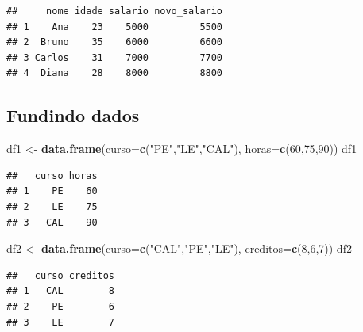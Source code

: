 \documentclass[
]{book}
\newenvironment{Shaded}{\begin{snugshade}}{\end{snugshade}}
\newcommand{\AttributeTok}[1]{\textcolor[rgb]{0.13,0.29,0.53}{#1}}
\newcommand{\CommentTok}[1]{\textcolor[rgb]{0.56,0.35,0.01}{\textit{#1}}}
\newcommand{\ConstantTok}[1]{\textcolor[rgb]{0.56,0.35,0.01}{#1}}
\newcommand{\DecValTok}[1]{\textcolor[rgb]{0.00,0.00,0.81}{#1}}
\newcommand{\FunctionTok}[1]{\textcolor[rgb]{0.13,0.29,0.53}{\textbf{#1}}}
\newcommand{\NormalTok}[1]{#1}
\newcommand{\OtherTok}[1]{\textcolor[rgb]{0.56,0.35,0.01}{#1}}
\newcommand{\SpecialCharTok}[1]{\textcolor[rgb]{0.81,0.36,0.00}{\textbf{#1}}}
\newcommand{\StringTok}[1]{\textcolor[rgb]{0.31,0.60,0.02}{#1}}
\begin{document}
\begin{Shaded}
\end{Shaded}

\begin{verbatim}
##     nome idade salario novo_salario
## 1    Ana    23    5000         5500
## 2  Bruno    35    6000         6600
## 3 Carlos    31    7000         7700
## 4  Diana    28    8000         8800
\end{verbatim}

\subsection{Fundindo dados}\label{fundindo-dados}

\begin{Shaded}
\begin{Highlighting}[]
\NormalTok{df1 }\OtherTok{\textless{}{-}} \FunctionTok{data.frame}\NormalTok{(}\AttributeTok{curso=}\FunctionTok{c}\NormalTok{(}\StringTok{"PE"}\NormalTok{,}\StringTok{"LE"}\NormalTok{,}\StringTok{"CAL"}\NormalTok{), }\AttributeTok{horas=}\FunctionTok{c}\NormalTok{(}\DecValTok{60}\NormalTok{,}\DecValTok{75}\NormalTok{,}\DecValTok{90}\NormalTok{))}
\NormalTok{df1}
\end{Highlighting}
\end{Shaded}

\begin{verbatim}
##   curso horas
## 1    PE    60
## 2    LE    75
## 3   CAL    90
\end{verbatim}

\begin{Shaded}
\begin{Highlighting}[]
\NormalTok{df2 }\OtherTok{\textless{}{-}} \FunctionTok{data.frame}\NormalTok{(}\AttributeTok{curso=}\FunctionTok{c}\NormalTok{(}\StringTok{"CAL"}\NormalTok{,}\StringTok{"PE"}\NormalTok{,}\StringTok{"LE"}\NormalTok{), }\AttributeTok{creditos=}\FunctionTok{c}\NormalTok{(}\DecValTok{8}\NormalTok{,}\DecValTok{6}\NormalTok{,}\DecValTok{7}\NormalTok{))}
\NormalTok{df2 }
\end{Highlighting}
\end{Shaded}

\begin{verbatim}
##   curso creditos
## 1   CAL        8
## 2    PE        6
## 3    LE        7
\end{verbatim}
\end{document}
